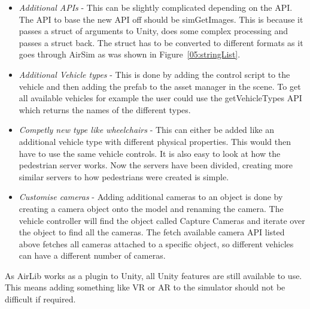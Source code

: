 \begin{itemize}
\item \emph{Additional APIs} - This can be slightly complicated depending on the API. The API to base the new API off should be simGetImages. This is because it passes a struct of arguments to Unity, does some complex processing and passes a struct back. The struct has to be converted to different formats as it goes through AirSim as was shown in Figure~\ref{05:stringList}.
\item \emph{Additional Vehicle types} - This is done by adding the control script to the vehicle and then adding the prefab to the asset manager in the scene. To get all available vehicles for example the user could use the getVehicleTypes API which returns the names of the different types.  
\item \emph{Competly new type like wheelchairs} - This can either be added like an additional vehicle type with different physical properties. This would then have to use the same vehicle controls. It is also easy to look at how the pedestrian server works. Now the servers have been divided, creating more similar servers to how pedestrians were created is simple.  
\item \emph{Customise cameras} - Adding additional cameras to an object is done by creating a camera object onto the model and renaming the camera. The vehicle controller will find the object called Capture Cameras and iterate over the object to find all the cameras. The fetch available camera API listed above fetches all cameras attached to a specific object, so different vehicles can have a different number of cameras. 
\end{itemize}

As AirLib works as a plugin to Unity, all Unity features are still available to use. This means adding something like VR or AR to the simulator should not be difficult if required.  







